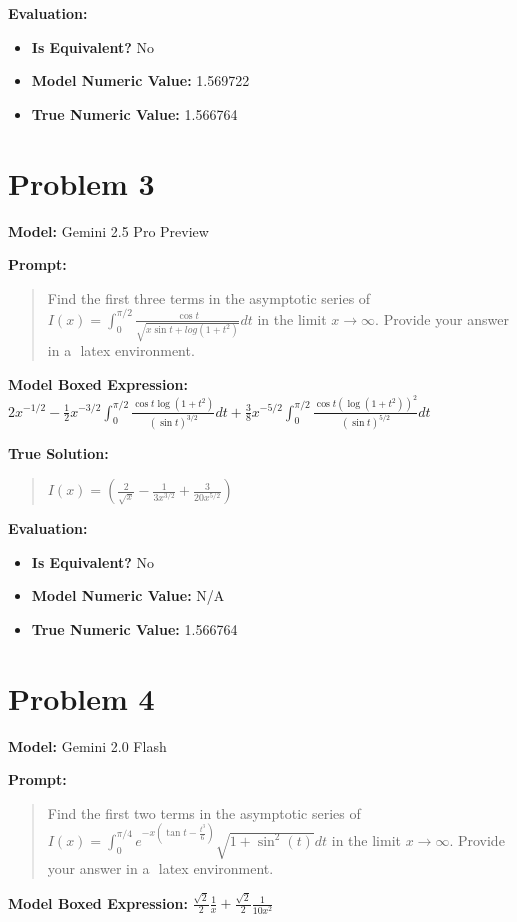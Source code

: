 \documentclass{article}
\begin{document}
\textbf{Evaluation:}
\begin{itemize}
\item \textbf{Is Equivalent?} No
\item \textbf{Model Numeric Value:} 1.569722
\item \textbf{True Numeric Value:} 1.566764
\end{itemize}
\vspace{1cm}
\section*{Problem 3}
\textbf{Model:} Gemini 2.5 Pro Preview

\textbf{Prompt:}
\begin{quote}
Find the first three terms in the asymptotic series of $I(x)=\int_0^{\pi/2} \frac{\cos{t}}{\sqrt{x\sin{t}+log(1+t^2)}}dt$ in the limit $x \to \infty$. Provide your answer in a $\boxed{}$ latex environment.
\end{quote}
\textbf{Model Boxed Expression:} $2x^{-1/2} - \frac{1}{2}x^{-3/2}\int_0^{\pi/2} \frac{\cos{t}\log(1+t^2)}{(\sin{t})^{3/2}}dt + \frac{3}{8}x^{-5/2}\int_0^{\pi/2} \frac{\cos{t}(\log(1+t^2))^2}{(\sin{t})^{5/2}}dt$

\textbf{True Solution:}
\begin{quote}
$I(x)=(\frac{2}{\sqrt{x}}-\frac{1}{3x^{3/2}}+\frac{3}{20x^{5/2}} )$
\end{quote}

\textbf{Evaluation:}
\begin{itemize}
\item \textbf{Is Equivalent?} No
\item \textbf{Model Numeric Value:} N/A
\item \textbf{True Numeric Value:} 1.566764
\end{itemize}
\vspace{1cm}
\section*{Problem 4}
\textbf{Model:} Gemini 2.0 Flash

\textbf{Prompt:}
\begin{quote}
Find the first two terms in the asymptotic series of $I(x)=\int_0^{\pi/4} e^{-x(\tan{t}-\frac{t^3}{6})}\sqrt{1+\sin^2(t)}dt$ in the limit $x \to \infty$. Provide your answer in a $\boxed{}$ latex environment.
\end{quote}
\textbf{Model Boxed Expression:} $\frac{\sqrt{2}}{2} \frac{1}{x} + \frac{\sqrt{2}}{2} \frac{1}{10x^2}$
\end{document}
